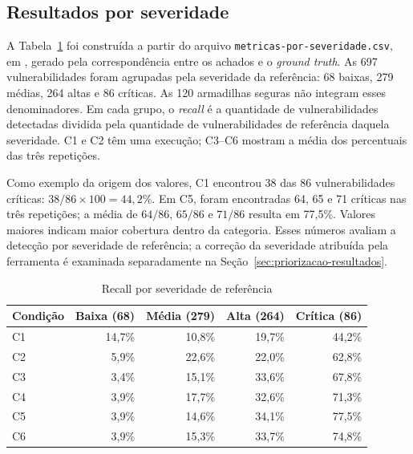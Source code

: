 \subsection{Resultados por severidade}\label{subsec:resultados-por-severidade}

A Tabela~\ref{tab:recall-severidade} foi construída a partir do arquivo
\texttt{metricas-por-severidade.csv}, em , gerado pela
correspondência entre os achados e o \textit{ground truth}. As 697
vulnerabilidades foram agrupadas pela severidade da referência: 68 baixas,
279 médias, 264 altas e 86 críticas. As 120 armadilhas seguras não integram
esses denominadores. Em cada grupo, o \textit{recall} é a quantidade de
vulnerabilidades detectadas dividida pela quantidade de vulnerabilidades de
referência daquela severidade. C1 e C2 têm uma execução; C3--C6 mostram a
média dos percentuais das três repetições.

Como exemplo da origem dos valores, C1 encontrou 38 das 86 vulnerabilidades
críticas: $38/86\times100=44,2\%$. Em C5, foram encontradas 64, 65 e 71
críticas nas três repetições; a média de
$64/86$, $65/86$ e $71/86$ resulta em 77,5\%. Valores maiores indicam maior
cobertura dentro da categoria. Esses números avaliam a detecção por
severidade de referência; a correção da severidade atribuída pela ferramenta
é examinada separadamente na Seção~\ref{sec:priorizacao-resultados}.

\begin{table}[htb]
\ABNTEXfontereduzida
\caption{\label{tab:recall-severidade}Recall por severidade de referência}
\centering
\begin{tabular}{lrrrr}
\hline
\textbf{Condição} & \textbf{Baixa (68)} & \textbf{Média (279)} & \textbf{Alta (264)} & \textbf{Crítica (86)} \\
\hline
C1 & 14,7\% & 10,8\% & 19,7\% & 44,2\% \\
C2 & 5,9\% & 22,6\% & 22,0\% & 62,8\% \\
C3 & 3,4\% & 15,1\% & 33,6\% & 67,8\% \\
C4 & 3,9\% & 17,7\% & 32,6\% & 71,3\% \\
C5 & 3,9\% & 14,6\% & 34,1\% & 77,5\% \\
C6 & 3,9\% & 15,3\% & 33,7\% & 74,8\% \\
\hline
\end{tabular}
\end{table}

